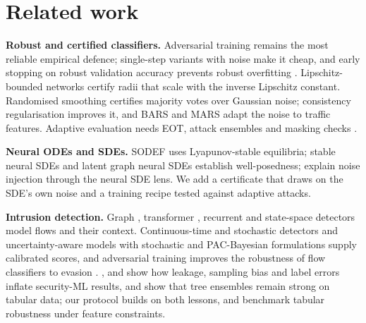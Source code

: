 \documentclass{article}
\theoremstyle{definition}
\begin{document}
\section{Related work}\label{sec:related}
\textbf{Robust and certified classifiers.} Adversarial training
\citep{madry2018pgd,zhang2019trades} remains the most reliable empirical
defence; single-step variants with noise \citep{dejorge2022nfgsm} make it
cheap, and early stopping on robust validation accuracy prevents robust
overfitting \citep{rice2020overfitting}. Lipschitz-bounded networks
\citep{tsuzuku2018lipschitz,anil2019sorting,araujo2023sll} certify radii that
scale with the inverse Lipschitz constant. Randomised smoothing
\citep{cohen2019smoothing,salman2019smoothadv,yang2020smoothing} certifies
majority votes over Gaussian noise; consistency regularisation
\citep{jeong2020consistency} improves it, and BARS \citep{wang2023bars} and
MARS \citep{huang2025mars} adapt the noise to traffic features. Adaptive
evaluation needs EOT, attack ensembles and masking checks
\citep{athalye2018obfuscated,croce2020autoattack,carlini2019evaluating}.

\textbf{Neural ODEs and SDEs.} SODEF \citep{kang2021sodef} uses Lyapunov-stable
equilibria; stable neural SDEs \citep{oh2024stablesde} and latent graph neural
SDEs \citep{bergna2024lgnsde} establish well-posedness;
\citet{liu2020sdenoise} explain noise injection through the neural SDE lens. We
add a certificate that draws on the SDE's own noise and a training recipe tested
against adaptive attacks.

\textbf{Intrusion detection.} Graph \citep{lo2022egraphsage}, transformer
\citep{wu2022rtids}, recurrent \citep{halbouni2022cnnlstm} and state-space
\citep{mosaiyebzadeh2025graphmamba} detectors model flows and their context.
Continuous-time and stochastic detectors
\citep{anaedevha2026ode,anaedevha2026mstgnn} and uncertainty-aware models with
stochastic and PAC-Bayesian formulations
\citep{anaedevha2025stochtx,anaedevha2026pacbayes} supply calibrated scores, and
adversarial training improves the robustness of flow classifiers to evasion
\citep{anaedevha2024robust}.
\citet{arp2022dos}, \citet{pendlebury2019tesseract} and
\citet{engelen2021troubleshooting} show how leakage, sampling bias and label
errors inflate security-ML results, and \citet{grinsztajn2022trees} show that
tree ensembles remain strong on tabular data; our protocol builds on both
lessons, and \citet{simonetto2024tabularbench} benchmark tabular robustness
under feature constraints.
\end{document}
